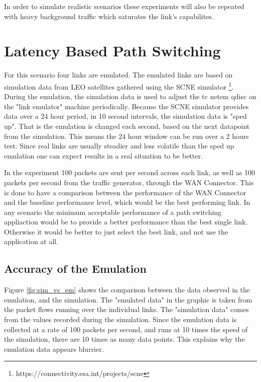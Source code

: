 In order to simulate realistic scenarios these experiments will also be repeated with heavy background traffic which saturates the link's capabilites.


\section{Latency Based Path Switching}

For this scenario four links are emulated. The emulated links are based on simulation data from LEO satellites gathered using the SCNE simulator \footnote{https://connectivity.esa.int/projects/scne}. During the emulation, the simulation data is used to adjust the tc netem qdisc on the "link emulator" machine periodically. Because the SCNE simulator provides data over a 24 hour period, in 10 second intervals, the simulation data is "sped up". That is the emulation is changed each second, based on the next datapoint from the simulation. This means the 24 hour window can be run over a 2 hours test. Since real links are usually steadier and less volatile than the sped up emulation one can expect results in a real situation to be better.

In the experiment 100 packets are sent per second across each link, as well as 100 packets per second from the traffic generator, through the WAN Connector. This is done to have a comparison between the performance of the WAN Connector and the baseline performance level, which would be the best performing link. In any scenario the minimum acceptable performance of a path switching appliaction would be to provide a better performance than the best single link. Otherwise it would be better to just select the best link, and not use the application at all.

\subsection{Accuracy of the Emulation}

Figure \ref{fig:sim_vs_em} shows the comparison between the data observed in the emulation, and the simulation. The "emulated data" in the graphic is taken from the packet flows running over the individual links. The "simulation data" comes from the values recorded during the simulation. Since the emulation data is collected at a rate of 100 packets per second, and runs at 10 times the speed of the simulation, there are 10 times as many data points. This explains why the emulation data appears blurrier.

